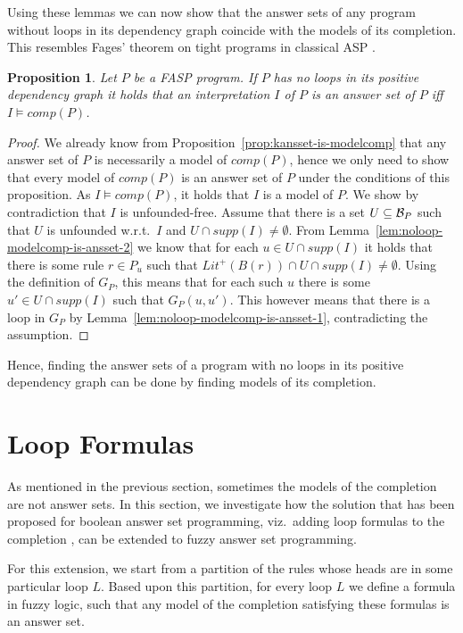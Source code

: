 \documentclass{tlp}
\newcommand{\hbase}[1]{{\ensuremath{{\cal B}_{#1}}}}
\newcommand{\body}[1]{\ensuremath{B(#1)}}
\newcommand{\comp}[1]{\ensuremath{comp(#1)}}
\newcommand{\poslit}[1]{\ensuremath{Lit^{+}(#1)}}
\newcommand{\posbody}[1]{\ensuremath{\poslit{\body{#1}}}}
\newcommand{\depgraph}[1]{\ensuremath{G_{#1}}}
\newcommand{\supp}[1]{\ensuremath{\mathit{supp}(#1)}}
\newtheorem{proposition}{Proposition}
\begin{document}
Using these lemmas we can now show that the answer sets of any program without loops in its dependency graph coincide with the models of its completion. This resembles Fages' theorem on tight programs in classical ASP \cite{fages:completion}.

\begin{proposition}\label{prop:noloops-ansset-is-modelcomp}
 Let $P$ be a FASP program. If $P$ has no loops in its positive dependency graph it holds that an interpretation $I$ of $P$ is
 an answer set of $P$ iff $I \models \comp{P}$.
\end{proposition}
\begin{proof}
 We already know from Proposition~\ref{prop:kansset-is-modelcomp} that any answer set of $P$ is necessarily a model of $\comp{P}$, hence we only need to show that every model of $\comp{P}$ is an answer set of $P$ under the conditions of this proposition. As $I \models \comp{P}$, it holds that $I$ is a model of $P$. We show by contradiction that $I$ is unfounded-free. Assume that there is a set $U \subseteq \hbase{P}$ such that $U$ is unfounded w.r.t.~$I$ and $U \cap \supp{I} \neq \emptyset$. From Lemma~\ref{lem:noloop-modelcomp-is-ansset-2} we know that for each $u \in U \cap \supp{I}$ it holds that there is some rule $r \in P_u$ such that $\posbody{r} \cap U \cap \supp{I} \neq \emptyset$. Using the definition of $\depgraph{P}$, this means that for each such $u$ there is some $u' \in U \cap \supp{I}$ such that $\depgraph{P}(u,u')$. This however means that there is a loop in $\depgraph{P}$ by Lemma~\ref{lem:noloop-modelcomp-is-ansset-1}, contradicting the assumption.
\end{proof}

Hence, finding the answer sets of a program with no loops in its positive dependency graph can be done by finding models of its completion.

\section{Loop Formulas}\label{sec:loopelimination}

As mentioned in the previous section, sometimes the models of the completion are not answer sets. In this section, we investigate how the solution that has been proposed for boolean answer set programming, viz.~adding loop formulas to the completion \cite{assat-linzhao}, can be extended to fuzzy answer set programming.

For this extension, we start from a partition of the rules whose heads are in some particular loop $L$. Based upon this partition, for every loop $L$ we define a formula in fuzzy logic, such that any model of the completion satisfying these formulas is an answer set.
\end{document}
